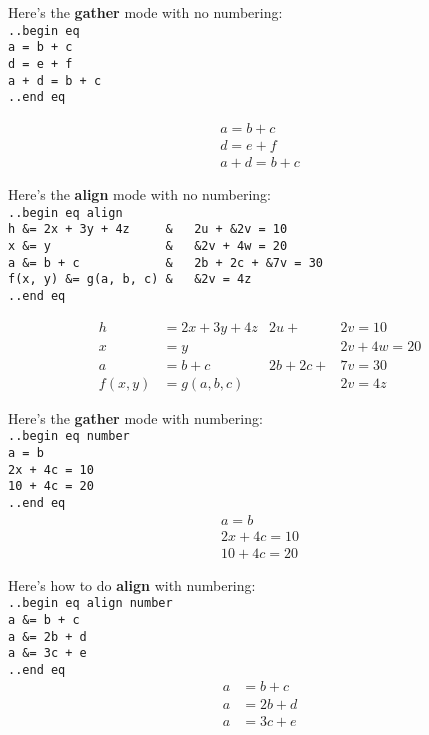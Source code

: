 \documentclass[12pt]{article}
\begin{document}
\begin{flushleft}
Here's the \textbf{gather} mode with no numbering: \\
\verb|..begin eq|\\
\verb|a = b + c|\\
\verb|d = e + f|\\
\verb|a + d = b + c|\\
\verb|..end eq|

\begin{gather*}
a = b + c \\
d = e + f \\
a + d = b + c 
\end{gather*}

\medskip

Here's the \textbf{align} mode with no numbering: \\
\verb|..begin eq align|\\
\verb|h &= 2x + 3y + 4z     &   2u + &2v = 10|\\
\verb|x &= y                &   &2v + 4w = 20|\\
\verb|a &= b + c            &   2b + 2c + &7v = 30|\\
\verb|f(x, y) &= g(a, b, c) &   &2v = 4z|\\
\verb|..end eq|

\begin{align*}
h &= 2x + 3y + 4z           &   2u + &2v = 10 \\
x &= y                      &   &2v + 4w = 20 \\
a &= b + c                  &   2b + 2c + &7v = 30 \\
f(x, y) &= g(a, b, c)       &   &2v = 4z 
\end{align*}

\medskip

Here's the \textbf{gather} mode with numbering: \\
\verb|..begin eq number|\\
\verb|a = b|\\
\verb|2x + 4c = 10|\\
\verb|10 + 4c = 20|\\
\verb|..end eq|
\begin{gather}
a = b \\
2x + 4c = 10 \\
10 + 4c = 20 
\end{gather}

\medskip

Here's how to do \textbf{align} with numbering: \\
\verb|..begin eq align number|\\
\verb|a &= b + c|\\
\verb|a &= 2b + d|\\
\verb|a &= 3c + e|\\
\verb|..end eq|
\begin{align}
a &= b + c \\
a &= 2b + d \\
a &= 3c + e 
\end{align}

\end{flushleft}
\end{document}
